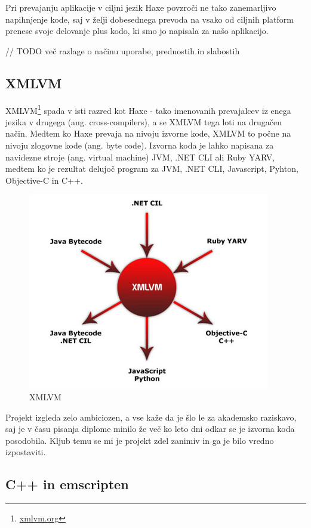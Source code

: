 Pri prevajanju aplikacije v ciljni jezik Haxe povzroči ne tako zanemarljivo napihnjenje kode, saj v želji dobesednega prevoda na vsako od ciljnih platform prenese svoje delovanje plus kodo, ki smo jo napisala za našo aplikacijo.

// TODO več razlage o načinu uporabe, prednostih in slabostih

\subsection{XMLVM}

XMLVM\footnote{\href{http://xmlvm.org}{xmlvm.org}} spada v isti razred kot Haxe - tako imenovanih prevajalcev iz enega jezika v drugega (ang. cross-compilers), a se XMLVM tega loti na drugačen način. Medtem ko Haxe prevaja na nivoju izvorne kode, XMLVM to počne na nivoju zlogovne kode (ang. byte code). Izvorna koda je lahko napisana za navidezne stroje (ang. virtual machine) JVM, .NET CLI ali Ruby YARV, medtem ko je rezultat delujoč program za JVM, .NET CLI, Javascript, Pyhton, Objective-C in C++.

\begin{figure}
 \includegraphics[scale=0.5]{xmlvm}
 \caption{XMLVM}
 \label{fig:xmlvm}
\end{figure}

Projekt izgleda zelo ambiciozen, a vse kaže da je šlo le za akademsko raziskavo, saj je v času pisanja diplome minilo že več ko leto dni odkar se je izvorna koda posodobila. Kljub temu se mi je projekt zdel zanimiv in ga je bilo vredno izpostaviti.

\subsection{C++ in emscripten}

